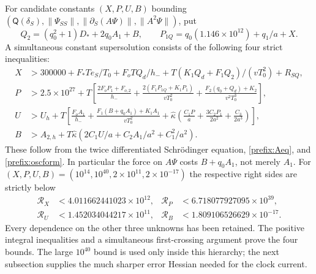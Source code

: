 \documentclass[11pt]{article}
\theoremstyle{definition}\newtheorem{definition}[theorem]{Definition}
\theoremstyle{remark}\newtheorem{remark}[theorem]{Remark}
\begin{document}
For candidate constants $(X,P,U,B)$ bounding
$(\mathsf Q(\delta_S),\|\Psi_{SS}\|,\|\partial_S(A\Psi)\|,
\|A^2\Psi\|)$, put
\[
 Q_2=(q_0^2+1)D_*+2q_0A_1+B,\qquad
 P_{1Q}=q_0(1.146\times10^{12})+q_1/a+X.
\]
A simultaneous constant supersolution consists of the following four
strict inequalities:
\begin{align}
 X&>300000+F_*Te_S/T_0+F_oTQ_d/h_-
             +T(K_1Q_d+F_1Q_2)/(vT_0^2)+R_{SQ},\nonumber\\
 P&>2.5\times10^{27}+T\left[
 \frac{2F_oP_1+F_{o,2}}{h_-}
 +\frac{2(F_1P_{1Q}+K_1P_1)}{vT_0^2}
 +\frac{F_2(q_0+Q_d)+K_2}{v^2T_0^3}\right],\nonumber\\
 U&>U_h+T\left[\frac{F_oA_1}{h_-}
  +\frac{F_1(B+q_0A_1)+K_1A_1}{vT_0^2}
  +\widehat\kappa\left(\frac{C_1P}{a}
      +\frac{3C_2P_1}{2a^2}+\frac{C_3}{2a^3}\right)\right],\nonumber\\
 B&>A_{2,h}+T\widehat\kappa
         (2C_1U/a+C_2A_1/a^2+C_1^2/a^2).
 \label{prefix:fourrows}
\end{align}
These follow from the twice differentiated Schr\"odinger equation,
\eqref{prefix:Aeq}, and \eqref{prefix:oscform}.  In particular the force
on $A\Psi$ costs $B+q_0A_1$, not merely $A_1$.
For $(X,P,U,B)=(10^{14},10^{40},2\times10^{11},2\times10^{-17})$
the respective right sides are strictly below
\[
 \begin{aligned}
 \mathcal R_X&<4.011662441023\times10^{12},&
 \mathcal R_P&<6.718077927095\times10^{39},\\
 \mathcal R_U&<1.452034044217\times10^{11},&
 \mathcal R_B&<1.809106526629\times10^{-17}.
 \end{aligned}
\]
Every dependence on the other three unknowns has been retained.
The positive integral inequalities and a simultaneous first-crossing
argument prove the four bounds.  The large $10^{40}$ bound is used
only inside this hierarchy; the next subsection supplies the much
sharper error Hessian needed for the clock current.
\end{document}
